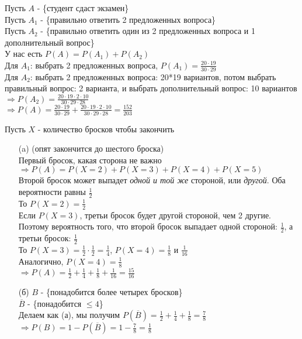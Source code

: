 \begin{exercise}[4]
	Пусть $A$ - \{студент сдаст экзамен\} \\ Пусть $A_1$ - \{правильно ответить 2 предложенных вопроса\} \\ Пусть $A_2$ - \{правильно ответить один из 2 предложенных вопроса и 1 дополнительный вопрос\} \\ У нас есть $P(A) = P(A_1) + P(A_2)$ \\ Для $A_1$: выбрать 2 предложенных вопроса, $P(A_1) = \frac{20 \cdot 19}{30 \cdot 29}$ \\ Для $A_2$: выбрать 2 предложенных вопроса: 20*19 вариантов, потом выбрать правильный вопрос: 2 варианта, и выбрать дополнительный вопрос: 10 вариантов \\ $\Rightarrow P(A_2) = \frac{20 \cdot 19 \cdot 2 \cdot 10}{30 \cdot 29 \cdot 28}$ \\ $\Rightarrow P(A) = \frac{20 \cdot 19}{30 \cdot 29} + \frac{20 \cdot 19 \cdot 2 \cdot 10}{30 \cdot 29 \cdot 28} = \frac{152}{203}$
\end{exercise}

\begin{exercise}[6]
	Пусть $X$ - количество бросков чтобы закончить
	\begin{enumerate}
		\item [(a)] (опят закончится до шестого броска) \\ Первый бросок, какая сторона не важно $\Rightarrow P(A) = P(X=2) + P(X=3) + P(X=4) + P(X=5)$ \\ Второй бросок может выпадет \textit{одной и той же} стороной, или \textit{другой}. Оба вероятности равны $\frac{1}{2}$ \\ То $P(X=2) = \frac{1}{2}$ \\ Если $P(X=3)$, третьи бросок будет другой стороной, чем 2 другие. Поэтому вероятность того, что второй бросок выпадает одной стороной: $\frac{1}{2}$, а третьи бросок: $\frac{1}{2}$ \\ То $P(X=3) = \frac{1}{2} \cdot \frac{1}{2} = \frac{1}{4}$, $P(X=4) = \frac{1}{8}$ и $\frac{1}{16}$ \\ Аналогично, $P(X=4) = \frac{1}{8}$ \\ $\Rightarrow P(A) = \frac{1}{2} + \frac{1}{4} + \frac{1}{8} + \frac{1}{16} = \frac{15}{16}$ 
		\item [(б)] $B$ - \{понадобится более четырех бросков\} \\ $\overline{B}$ - \{понадобится $\leq 4$\} \\ Делаем как (а), мы получим $P(\overline{B}) = \frac{1}{2} + \frac{1}{4} + \frac{1}{8} = \frac{7}{8}$ \\ $\Rightarrow P(B) = 1 - P(\overline{B}) = 1 - \frac{7}{8} = \frac{1}{8}$
	\end{enumerate}
\end{exercise}

